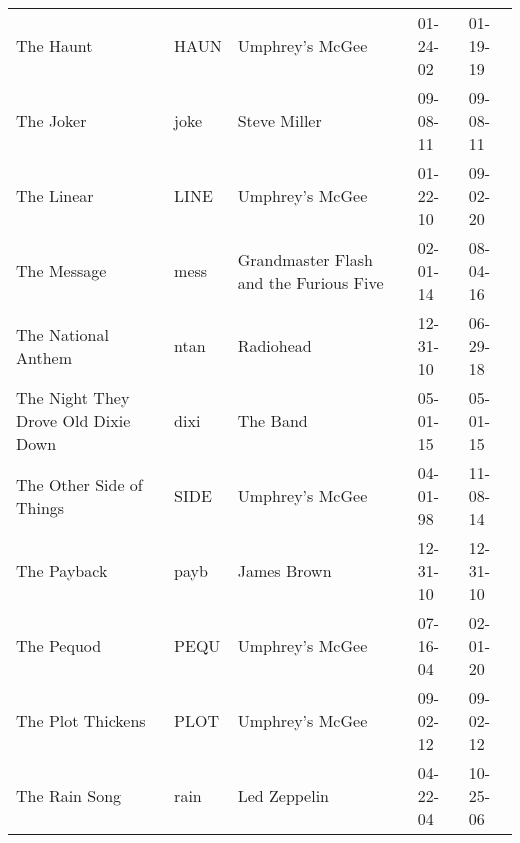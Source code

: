 \begin{longtable}{p{}p{}p{}p{}p{}}
                                                               The Haunt &          HAUN &                                          Umphrey's McGee &              01-24-02 &             01-19-19 \\
                                                               The Joker &          joke &                                             Steve Miller &              09-08-11 &             09-08-11 \\
                                                              The Linear &          LINE &                                          Umphrey's McGee &              01-22-10 &             09-02-20 \\
                                                             The Message &          mess &                   Grandmaster Flash and the Furious Five &              02-01-14 &             08-04-16 \\
                                                     The National Anthem &          ntan &                                                Radiohead &              12-31-10 &             06-29-18 \\
                                     The Night They Drove Old Dixie Down &          dixi &                                                 The Band &              05-01-15 &             05-01-15 \\
                                                The Other Side of Things &          SIDE &                                          Umphrey's McGee &              04-01-98 &             11-08-14 \\
                                                             The Payback &          payb &                                              James Brown &              12-31-10 &             12-31-10 \\
                                                              The Pequod &          PEQU &                                          Umphrey's McGee &              07-16-04 &             02-01-20 \\
                                                       The Plot Thickens &          PLOT &                                          Umphrey's McGee &              09-02-12 &             09-02-12 \\
                                                           The Rain Song &          rain &                                             Led Zeppelin &              04-22-04 &             10-25-06 \\

\end{longtable}
